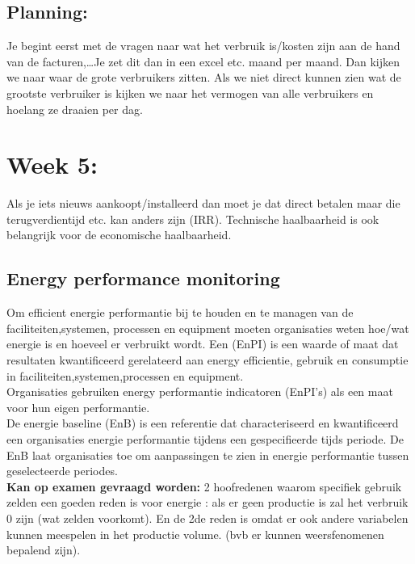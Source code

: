 \documentclass[12pt]{article}
\begin{document}
\subsection{Planning:}
Je begint eerst met de vragen naar wat het verbruik is/kosten zijn aan de hand van de facturen,\dots Je zet dit dan in een excel etc. maand per maand. Dan kijken we naar waar de grote verbruikers zitten. Als we niet direct kunnen zien wat de grootste verbruiker is kijken we naar het vermogen van alle verbruikers en hoelang ze draaien per dag. 
\section{Week 5:}
Als je iets nieuws aankoopt/installeerd dan moet je dat direct betalen maar die terugverdientijd etc. kan anders zijn (IRR). Technische haalbaarheid is ook belangrijk voor de economische haalbaarheid.
\subsection{Energy performance monitoring}
Om efficient energie performantie bij te houden en te managen van de faciliteiten,systemen, processen en equipment moeten organisaties weten hoe/wat energie is en hoeveel er verbruikt wordt. Een (EnPI) is een waarde of maat dat resultaten kwantificeerd gerelateerd aan energy efficientie, gebruik en consumptie in faciliteiten,systemen,processen en equipment.\\ \bigbreak 
Organisaties gebruiken energy performantie indicatoren (EnPI's) als een maat voor hun eigen performantie.\\ De energie baseline (EnB) is een referentie dat characteriseerd en kwantificeerd een organisaties energie performantie tijdens een gespecifieerde tijds periode. De EnB laat organisaties toe om aanpassingen te zien in energie performantie tussen geselecteerde periodes.
\\ \textbf{Kan op examen gevraagd worden:}
2 hoofredenen waarom specifiek gebruik zelden een goeden reden is voor energie : als er geen productie is zal het verbruik 0 zijn (wat zelden voorkomt). En de 2de reden is omdat er ook andere variabelen kunnen meespelen in het productie volume. (bvb er kunnen weersfenomenen bepalend zijn).
\end{document}
